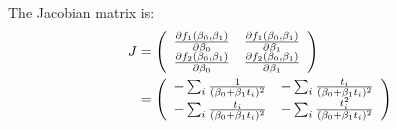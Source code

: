 \documentclass[12pt]{article}
\begin{document}
\begin{enumerate}[(b)]
The Jacobian matrix is:
\begin{align*}
J &=
\left( {\begin{array}{*{20}c}
\frac{\partial f_1(\beta_0, \beta_1) }{\partial \beta_0}&\frac{\partial f_1(\beta_0, \beta_1) }{\partial \beta_1}\\
\frac{\partial f_2(\beta_0, \beta_1) }{\partial \beta_0}&\frac{\partial f_2(\beta_0, \beta_1) } {\partial \beta_1}\\
 \end{array} } \right) \\
&=
\left( {\begin{array}{*{20}c}
  - \sum_i \frac{1} {(\beta_0 + \beta_1 t_i)^2 } & -\sum_i \frac{t_i} {(\beta_0 + \beta_1 t_i)^2 }\\
- \sum_i \frac{t_i} {(\beta_0 + \beta_1 t_i)^2 } & -\sum_i \frac{t_i^2} {(\beta_0 + \beta_1 t_i)^2 }\\
 \end{array} } \right)  \\
\end{align*}



\end{enumerate}
\end{document}
